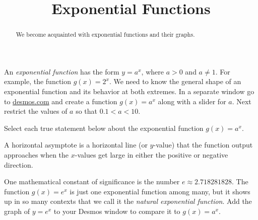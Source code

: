 

\title{Exponential Functions}


\begin{abstract}
We become acquainted with exponential functions and their graphs.
\end{abstract}
\maketitle


An \emph{exponential function} has the form $y=a^x$, where $a>0$ and $a\ne1$. For example, the function $g(x)=2^x$. We need to know the general shape of an exponential function and its behavior at both extremes. In a separate window go to \url{desmos.com} and create a function $g(x)=a^x$ along with a slider for $a$. Next restrict the values of $a$ so that $0.1<a<10$.

\begin{question}
Select each true statement below about the exponential function $g(x)=a^x$.
  \begin{solution}
    \begin{multiple-choice}
    \end{multiple-choice}
    \begin{hint}
      A horizontal asymptote is a horizontal line (or $y$-value) that the function output approaches when the $x$-values get large in either the positive or negative direction.
    \end{hint}
  \end{solution}
\end{question}


One mathematical constant of significance is the number $e\approx2.718281828$. The function $g(x)=e^x$ is just one exponential function among many, but it shows up in so many contexts that we call it the \emph{natural exponential function}. Add the graph of $y=e^x$ to your Desmos window to compare it to $g(x)=a^x$.

